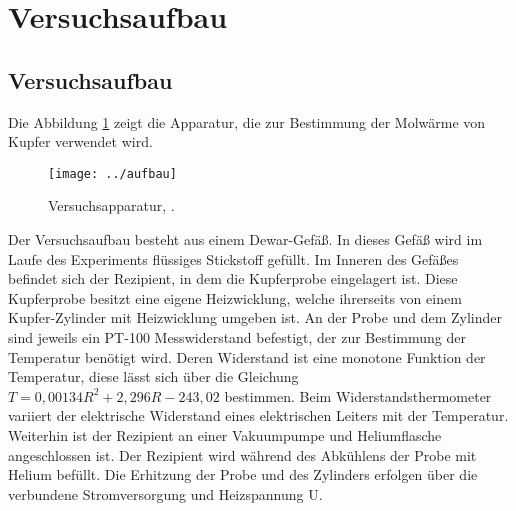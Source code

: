 \section{Versuchsaufbau}

\subsection{Versuchsaufbau}
Die Abbildung \ref{fig:aufbau} zeigt die Apparatur, die zur Bestimmung der Molwärme von Kupfer verwendet wird. 

\begin{figure}[h!]
	\centering
	\texttt{[image: ../aufbau]}
	\caption{Versuchsapparatur, \cite[]{anleitungV47}.}
	\label{fig:aufbau}
\end{figure}

Der Versuchsaufbau besteht aus einem Dewar-Gefäß. In dieses Gefäß wird im Laufe des Experiments flüssiges Stickstoff gefüllt. Im Inneren des Gefäßes befindet sich der Rezipient, in dem die Kupferprobe eingelagert ist. Diese Kupferprobe besitzt eine eigene Heizwicklung, welche ihrerseits von einem Kupfer-Zylinder mit Heizwicklung umgeben ist. An der Probe und dem Zylinder sind jeweils ein PT-100 Messwiderstand befestigt, der zur Bestimmung der Temperatur benötigt wird. Deren Widerstand ist eine monotone Funktion der Temperatur, diese lässt sich über die Gleichung $T=0,00134R^2+2,296R-243,02$ bestimmen. Beim Widerstandsthermometer variiert der elektrische Widerstand eines elektrischen Leiters mit der Temperatur. Weiterhin ist der Rezipient an einer Vakuumpumpe und Heliumflasche angeschlossen ist. Der Rezipient wird während des Abkühlens der Probe mit Helium befüllt. Die Erhitzung der Probe und des Zylinders erfolgen über die verbundene Stromversorgung und Heizspannung U. 

